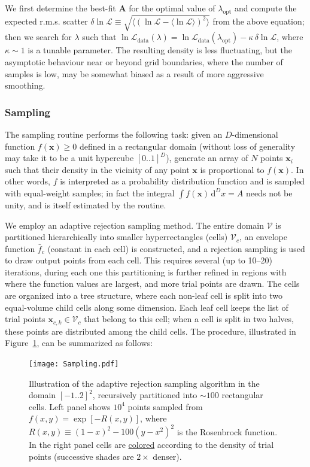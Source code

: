 \documentclass[12pt]{article}
\newcommand{\D}{\mathrm{d}}
\newcommand{\bA}{\boldsymbol{A}}
\newcommand{\bx}{\boldsymbol{x}}
\begin{document}
We first determine the best-fit $\bA$ for the optimal value of $\lambda_\mathrm{opt}$ and compute the expected r.m.s. scatter $\delta\ln\mathcal{L}\equiv \sqrt{\langle(\ln\mathcal{L}-\langle\ln\mathcal{L}\rangle)^2\rangle}$ from the above equation; then we search for $\lambda$ such that $\ln\mathcal{L}_\mathrm{data}(\lambda) = \ln\mathcal{L}_\mathrm{data}(\lambda_\mathrm{opt}) - \kappa\, \delta\ln\mathcal{L}$, where $\kappa\sim 1$ is a tunable parameter. The resulting density is less fluctuating, but the asymptotic behaviour near or beyond grid boundaries, where the number of samples is low, may be somewhat biased as a result of more aggressive smoothing.

\subsubsection{Sampling}  \label{sec:MathSamplingDetails}

The sampling routine performs the following task: given an $D$-dimensional function $f(\bx)\ge 0$ defined in a rectangular domain (without loss of generality may take it to be a unit hypercube $[0..1]^D$), generate an array of $N$ points $\bx_i$ such that their density in the vicinity of any point $\bx$ is proportional to $f(\bx)$. In other words, $f$ is interpreted as a probability distribution function and is sampled with equal-weight samples; in fact the integral $\int f(\bx)\, \D^D x = A$ needs not be unity, and is itself estimated by the routine.

We employ an adaptive rejection sampling method.
The entire domain $\mathcal{V}$ is partitioned hierarchically into smaller hyperrectangles (cells) $\mathcal{V}_c$, an envelope function $\bar f_c$ (constant in each cell) is constructed, and a rejection sampling is used to draw output points from each cell. This requires several (up to 10--20) iterations, during each one this partitioning is further refined in regions with where the function values are largest, and more trial points are drawn. The cells are organized into a tree structure, where each non-leaf cell is split into two equal-volume child cells along some dimension. Each leaf cell keeps the list of trial points $\bx_{c,k}\in\mathcal{V}_c$ that belong to this cell; when a cell is split in two halves, these points are distributed among the child cells.
The procedure, illustrated in Figure~\ref{fig:Sampling}, can be summarized as follows:

\begin{figure}
\begin{center}
\texttt{[image: Sampling.pdf]}
\end{center}
\caption{Illustration of the adaptive rejection sampling algorithm in the domain $[-1..2]^2$, recursively partitioned into $\sim 100$ rectangular cells. Left panel shows $10^4$ points sampled from $f(x,y) = \exp[-R(x,y)]$, where $R(x,y) \equiv (1-x)^2-100(y-x^2)^2$ is the Rosenbrock function. In the right panel cells are \href{https://www.google.com/search?q=mondrian&tbm=isch}{colored} according to the density of trial points (successive shades are $2\times$ denser).
} \label{fig:Sampling}
\end{figure}
\end{document}
